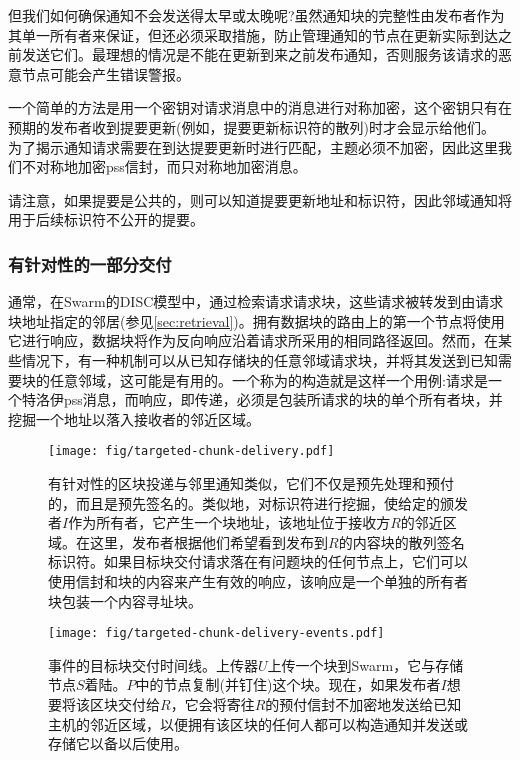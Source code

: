 但我们如何确保通知不会发送得太早或太晚呢?虽然通知块的完整性由发布者作为其单一所有者来保证，但还必须采取措施，防止管理通知的节点在更新实际到达之前发送它们。最理想的情况是不能在更新到来之前发布通知，否则服务该请求的恶意节点可能会产生错误警报。

一个简单的方法是用一个密钥对请求消息中的消息进行对称加密，这个密钥只有在预期的发布者收到提要更新(例如，提要更新标识符的散列)时才会显示给他们。
为了揭示通知请求需要在到达提要更新时进行匹配，主题必须不加密，因此这里我们不对称地加密pss信封，而只对称地加密消息。

请注意，如果提要是公共的，则可以知道提要更新地址和标识符，因此邻域通知将用于后续标识符不公开的提要。

\subsubsection{有针对性的一部分交付}

通常，在Swarm的DISC模型中，通过检索请求请求块，这些请求被转发到由请求块地址指定的邻居(参见\ref{sec:retrieval})。拥有数据块的路由上的第一个节点将使用它进行响应，数据块将作为反向响应沿着请求所采用的相同路径返回。然而，在某些情况下，有一种机制可以从已知存储块的任意邻域请求块，并将其发送到已知需要块的任意邻域，这可能是有用的。一个称为的构造就是这样一个用例:请求是一个特洛伊pss消息，而响应，即传递，必须是包装所请求的块的单个所有者块，并挖掘一个地址以落入接收者的邻近区域。  


\begin{figure}[htbp]
\centering
\texttt{[image: fig/targeted-chunk-delivery.pdf]}      
\caption[目标块交付\statusgreen]{有针对性的区块投递与邻里通知类似，它们不仅是预先处理和预付的，而且是预先签名的。类似地，对标识符进行挖掘，使给定的颁发者$I$作为所有者，它产生一个块地址，该地址位于接收方$R$的邻近区域。在这里，发布者根据他们希望看到发布到$R$的内容块的散列签名标识符。如果目标块交付请求落在有问题块的任何节点上，它们可以使用信封和块的内容来产生有效的响应，该响应是一个单独的所有者块包装一个内容寻址块。}
\label{fig:targeted-chunk-delivery}
\end{figure}

\begin{figure}[htbp]
\centering
\texttt{[image: fig/targeted-chunk-delivery-events.pdf]}
\caption[事件的目标块交付时间\statusgreen]{事件的目标块交付时间线。上传器$U$上传一个块到Swarm，它与存储节点$S$着陆。$P$中的节点复制(并钉住)这个块。现在，如果发布者$I$想要将该区块交付给$R$，它会将寄往$R$的预付信封不加密地发送给已知主机的邻近区域，以便拥有该区块的任何人都可以构造通知并发送或存储它以备以后使用。}
\label{fig:targeted-chunk-delivery-events}
\end{figure}



